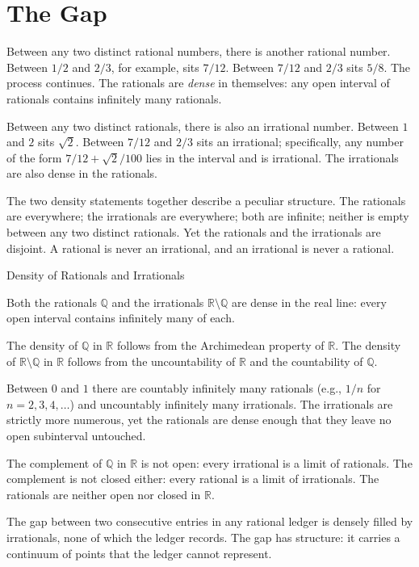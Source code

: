 \section{The Gap}
\label{se:the-gap}

Between any two distinct rational numbers, there is another rational
number. Between $1/2$ and $2/3$, for example, sits $7/12$. Between
$7/12$ and $2/3$ sits $5/8$. The process continues. The rationals are
\emph{dense} in themselves: any open interval of rationals contains
infinitely many rationals.

Between any two distinct rationals, there is also an irrational
number. Between $1$ and $2$ sits $\sqrt{2}$. Between $7/12$ and $2/3$
sits an irrational; specifically, any number of the form $7/12 +
\sqrt{2}/100$ lies in the interval and is irrational. The irrationals
are also dense in the rationals.

The two density statements together describe a peculiar structure.
The rationals are everywhere; the irrationals are everywhere; both are
infinite; neither is empty between any two distinct rationals. Yet the
rationals and the irrationals are disjoint. A rational is never an
irrational, and an irrational is never a rational.

\begin{phenom}{Density of Rationals and Irrationals}
\label{ph:density-rationals-irrationals}

\PhStatement Both the rationals $\mathbb{Q}$ and the irrationals
$\mathbb{R} \setminus \mathbb{Q}$ are dense in the real line: every
open interval contains infinitely many of each.

\PhOrigin The density of $\mathbb{Q}$ in $\mathbb{R}$ follows from the
Archimedean property of $\mathbb{R}$. The density of $\mathbb{R}
\setminus \mathbb{Q}$ in $\mathbb{R}$ follows from the uncountability
of $\mathbb{R}$ and the countability of $\mathbb{Q}$.

\PhObservation Between $0$ and $1$ there are countably infinitely
many rationals (e.g., $1/n$ for $n = 2, 3, 4, \ldots$) and
uncountably infinitely many irrationals. The irrationals are
strictly more numerous, yet the rationals are dense enough that
they leave no open subinterval untouched.

\PhConstraint The complement of $\mathbb{Q}$ in $\mathbb{R}$ is
not open: every irrational is a limit of rationals. The complement
is not closed either: every rational is a limit of irrationals.
The rationals are neither open nor closed in $\mathbb{R}$.

\PhConsequence The gap between two consecutive entries in any
rational ledger is densely filled by irrationals, none of which the
ledger records. The gap has structure: it carries a continuum of
points that the ledger cannot represent.

\end{phenom}

